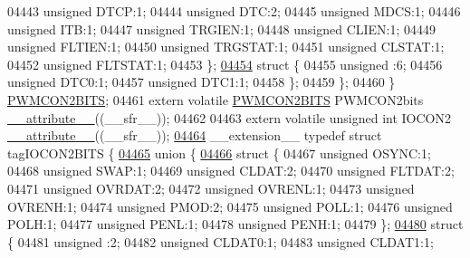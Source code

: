 \begin{DoxyCode}
04443       \textcolor{keywordtype}{unsigned} DTCP:1;
04444       \textcolor{keywordtype}{unsigned} DTC:2;
04445       \textcolor{keywordtype}{unsigned} MDCS:1;
04446       \textcolor{keywordtype}{unsigned} ITB:1;
04447       \textcolor{keywordtype}{unsigned} TRGIEN:1;
04448       \textcolor{keywordtype}{unsigned} CLIEN:1;
04449       \textcolor{keywordtype}{unsigned} FLTIEN:1;
04450       \textcolor{keywordtype}{unsigned} TRGSTAT:1;
04451       \textcolor{keywordtype}{unsigned} CLSTAT:1;
04452       \textcolor{keywordtype}{unsigned} FLTSTAT:1;
04453     \};
\hypertarget{a00015_source_l04454}{}\hyperlink{a00015}{04454}     \textcolor{keyword}{struct }\{
04455       \textcolor{keywordtype}{unsigned} :6;
04456       \textcolor{keywordtype}{unsigned} DTC0:1;
04457       \textcolor{keywordtype}{unsigned} DTC1:1;
04458     \};
04459   \};
04460 \} \hyperlink{a00014_d8/dba/a00681}{PWMCON2BITS};
04461 \textcolor{keyword}{extern} \textcolor{keyword}{volatile} \hyperlink{a00014_d8/dba/a00681}{PWMCON2BITS} PWMCON2bits \hyperlink{a00015_a493c46f03454991ccc5aa7a6e1dfb2a7}{\_\_attribute\_\_}((\_\_sfr\_\_));
04462 
04463 \textcolor{keyword}{extern} \textcolor{keyword}{volatile} \textcolor{keywordtype}{unsigned} \textcolor{keywordtype}{int}  IOCON2 \hyperlink{a00015_a493c46f03454991ccc5aa7a6e1dfb2a7}{\_\_attribute\_\_}((\_\_sfr\_\_));
\hypertarget{a00015_source_l04464}{}\hyperlink{a00014}{04464} \_\_extension\_\_ \textcolor{keyword}{typedef} \textcolor{keyword}{struct }tagIOCON2BITS \{
\hypertarget{a00015_source_l04465}{}\hyperlink{a00015}{04465}   \textcolor{keyword}{union }\{
\hypertarget{a00015_source_l04466}{}\hyperlink{a00015}{04466}     \textcolor{keyword}{struct }\{
04467       \textcolor{keywordtype}{unsigned} OSYNC:1;
04468       \textcolor{keywordtype}{unsigned} SWAP:1;
04469       \textcolor{keywordtype}{unsigned} CLDAT:2;
04470       \textcolor{keywordtype}{unsigned} FLTDAT:2;
04471       \textcolor{keywordtype}{unsigned} OVRDAT:2;
04472       \textcolor{keywordtype}{unsigned} OVRENL:1;
04473       \textcolor{keywordtype}{unsigned} OVRENH:1;
04474       \textcolor{keywordtype}{unsigned} PMOD:2;
04475       \textcolor{keywordtype}{unsigned} POLL:1;
04476       \textcolor{keywordtype}{unsigned} POLH:1;
04477       \textcolor{keywordtype}{unsigned} PENL:1;
04478       \textcolor{keywordtype}{unsigned} PENH:1;
04479     \};
\hypertarget{a00015_source_l04480}{}\hyperlink{a00015}{04480}     \textcolor{keyword}{struct }\{
04481       \textcolor{keywordtype}{unsigned} :2;
04482       \textcolor{keywordtype}{unsigned} CLDAT0:1;
04483       \textcolor{keywordtype}{unsigned} CLDAT1:1;

\end{DoxyCode}
